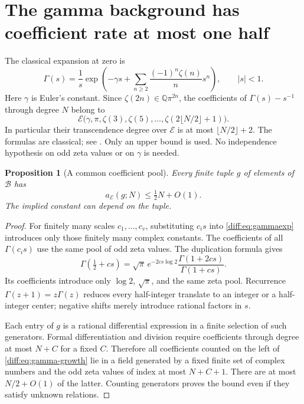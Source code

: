 \documentclass[11pt,a4paper]{article}
\newcommand{\Q}{\mathbb Q}
\newcommand{\E}{\mathcal E}
\newcommand{\B}{\mathscr B}
\newtheorem{proposition}[theorem]{Proposition}
\theoremstyle{definition}
\theoremstyle{remark}
\numberwithin{equation}{section}
\begin{document}
\section{The gamma background has coefficient rate at most one half}
\label{diff:sec:gamma-base}

The classical expansion at zero is
\begin{equation}\label{diff:eq:gammaexp}
 \Gamma(s)=\frac1s\exp\left(
   -\gamma s+\sum_{n\ge2}\frac{(-1)^n\zeta(n)}n s^n\right),
 \qquad |s|<1.
\end{equation}
Here $\gamma$ is Euler's constant. Since
$\zeta(2n)\in\Q\pi^{2n}$, the coefficients of
$\Gamma(s)-s^{-1}$ through degree $N$ belong to
\begin{equation}\label{diff:eq:zeta-pool}
 \E\bigl(\gamma,\pi,\zeta(3),\zeta(5),\ldots,
                   \zeta(2\lfloor N/2\rfloor+1)\bigr).
\end{equation}
In particular their transcendence degree over $\E$ is at most
$\lfloor N/2\rfloor+2$. The formulas are classical; see
\cite[\S\S5.7, 25.6]{DLMF}. Only an upper bound is used. No
independence hypothesis on odd zeta values or on $\gamma$ is needed.

\begin{proposition}[A common coefficient pool]\label{diff:prop:gamma-growth}
Every finite tuple $g$ of elements of $\B$ has
\begin{equation}\label{diff:eq:gamma-growth}
 a_{\E}(g;N)\le\tfrac12N+O(1).
\end{equation}
The implied constant can depend on the tuple.
\end{proposition}

\begin{proof}
For finitely many scales $c_1,\ldots,c_v$, substituting $c_is$
into \eqref{diff:eq:gammaexp} introduces only those finitely many
complex constants. The coefficients of all $\Gamma(c_is)$
use the same pool of odd zeta values. The duplication formula gives
\begin{equation}\label{diff:eq:duplication}
 \Gamma\left(\tfrac12+cs\right)
   =\sqrt\pi\,e^{-2cs\log2}
       \frac{\Gamma(1+2cs)}{\Gamma(1+cs)}.
\end{equation}
Its coefficients introduce only $\log2$, $\sqrt\pi$, and the
same zeta pool. Recurrence
$\Gamma(z+1)=z\Gamma(z)$ reduces every half-integer translate
to an integer or a half-integer center; negative shifts merely
introduce rational factors in $s$.

Each entry of $g$ is a rational differential expression in a finite
selection of such generators. Formal differentiation and division
require coefficients through degree at most $N+C$ for a fixed
$C$. Therefore all coefficients counted on the left of
\eqref{diff:eq:gamma-growth} lie in a field generated by a fixed finite
set of complex numbers and the odd zeta values of index at most
$N+C+1$. There are at most $N/2+O(1)$ of the latter. Counting
generators proves the bound even if they satisfy unknown relations.
\end{proof}
\end{document}
